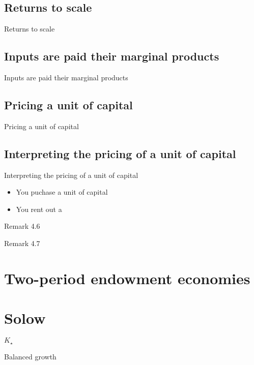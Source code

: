 \documentclass[presentation,dvipsnames]{beamer}
\begin{document}
\subsection{Returns to scale}
\begin{frame}[label=sec-2-6]{Returns to scale}
\end{frame}

\subsection{Inputs are paid their marginal products}
\begin{frame}[label=sec-2-7]{Inputs are paid their marginal products}
\end{frame}

\subsection{Pricing a unit of capital}
\begin{frame}[label=sec-2-8]{Pricing a unit of capital}
\end{frame}

\subsection{Interpreting the pricing of a unit of capital}
\begin{frame}[label=sec-2-9]{Interpreting the pricing of a unit of capital}
\begin{itemize}
\item You puchase a unit of capital
\item You rent out a 
\end{itemize}
\end{frame}

\begin{block}{Remark 4.6}
\end{block}
\begin{block}{Remark 4.7}
\end{block}
\section{Two-period endowment economies}
\label{sec-3}
\section{Solow}
\label{sec-4}
\begin{frame}[label=sec-4-1]{$K_{\star}$}
\end{frame}
\begin{frame}[label=sec-4-2]{Balanced growth}
\end{frame}
\end{document}

